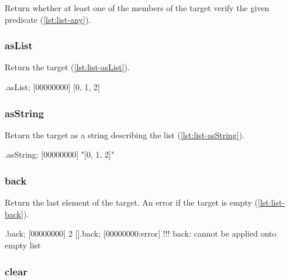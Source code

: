 Return whether at least one of the members of the target verify the
given predicate (\autoref{lst:list-any}).


\subsubsection{asList}

Return the target (\autoref{lst:list-asList}).

\begin{urbiscript}[caption=List.asList, label=lst:list-asList]
[0, 1, 2].asList;
[00000000] [0, 1, 2]
\end{urbiscript}

\subsubsection{asString}

Return the target as a string describing the list
(\autoref{lst:list-asString}).

\begin{urbiscript}[caption=List.asString, label=lst:list-asString]
[0, 1, 2].asString;
[00000000] "[0, 1, 2]"
\end{urbiscript}

\subsubsection{back}

Return the last element of the target. An error if the target is empty
(\autoref{lst:list-back}).

\begin{urbiscript}[caption=List.back, label=lst:list-back]
[0, 1, 2].back;
[00000000] 2
[].back;
[00000000:error] !!! back: cannot be applied onto empty list
\end{urbiscript}

\subsubsection{clear}

